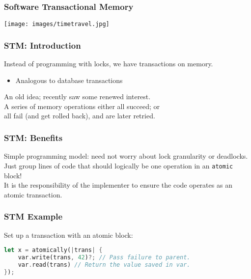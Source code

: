 \begin{frame}
\frametitle{Software Transactional Memory}

\begin{center}
	\texttt{[image: images/timetravel.jpg]}
\end{center}


\end{frame}


\begin{frame}
  \frametitle{STM: Introduction}


    Instead of programming with locks, we have transactions on memory.
      \begin{itemize}
        \item Analogous to database transactions
      \end{itemize}
    An old idea; recently saw some renewed interest.\\[1em]

    A series of memory operations either all succeed; or \\ \qquad
     all fail (and get
      rolled back), and are later retried.

\end{frame}

\begin{frame}
  \frametitle{STM: Benefits}


    Simple programming model: need not worry about lock
      granularity or deadlocks.\\[1em]

    Just group lines of code that should logically be one operation
      in an {\tt atomic} block!\\[1em]

    It is the responsibility of the implementer to ensure the code
      operates as an atomic transaction.

\end{frame}


\begin{frame}[fragile]
\frametitle{STM Example}

Set up a transaction with an atomic block:

\begin{lstlisting}[language=Rust]
let x = atomically(|trans| {
    var.write(trans, 42)?; // Pass failure to parent.
    var.read(trans) // Return the value saved in var.
});
\end{lstlisting}


\end{frame}


